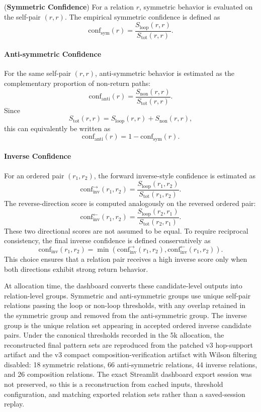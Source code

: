 \documentclass[12pt,a4paper]{article}
\begin{document}
(\textbf{Symmetric Confidence}) 
For a relation $r$, symmetric behavior is evaluated on the self-pair $(r,r)$. The empirical symmetric confidence is defined as
\[
\mathrm{conf}_{\mathrm{sym}}(r)
=
\frac{S_{\mathrm{loop}}(r,r)}
{S_{\mathrm{tot}}(r,r)}.
\]

\paragraph{Anti-symmetric Confidence} 
For the same self-pair $(r,r)$, anti-symmetric behavior is estimated as the complementary proportion of non-return paths:
\[
\mathrm{conf}_{\mathrm{anti}}(r)
=
\frac{S_{\mathrm{non}}(r,r)}
{S_{\mathrm{tot}}(r,r)}.
\]
Since
\[
S_{\mathrm{tot}}(r,r)
=
S_{\mathrm{loop}}(r,r) 
+
S_{\mathrm{non}}(r,r),
\]
this can equivalently be written as
\[
\mathrm{conf}_{\mathrm{anti}}(r)
=
1-\mathrm{conf}_{\mathrm{sym}}(r).
\]


\paragraph{Inverse Confidence} 
For an ordered pair $(r_1,r_2)$, the forward inverse-style confidence is estimated as
\[
\mathrm{conf}_{\mathrm{inv}}^{\rightarrow}(r_1,r_2)
=
\frac{S_{\mathrm{loop}}(r_1,r_2)}
{S_{\mathrm{tot}}(r_1,r_2)}.
\]
The reverse-direction score is computed analogously on the reversed ordered pair:
\[
\mathrm{conf}_{\mathrm{inv}}^{\leftarrow}(r_1,r_2)
=
\frac{S_{\mathrm{loop}}(r_2,r_1)}
{S_{\mathrm{tot}}(r_2,r_1)}.
\]
These two directional scores are not assumed to be equal. To require reciprocal consistency, the final inverse confidence is defined conservatively as
\[
\mathrm{conf}_{\mathrm{inv}}(r_1,r_2)
=
\min\!\left(
\mathrm{conf}_{\mathrm{inv}}^{\rightarrow}(r_1,r_2),
\mathrm{conf}_{\mathrm{inv}}^{\leftarrow}(r_1,r_2)
\right).
\]
This choice ensures that a relation pair receives a high inverse score only when both directions exhibit strong return behavior.

At allocation time, the dashboard converts these candidate-level outputs into relation-level groups. Symmetric and anti-symmetric groups use unique self-pair relations passing the loop or non-loop thresholds, with any overlap retained in the symmetric group and removed from the anti-symmetric group. The inverse group is the unique relation set appearing in accepted ordered inverse candidate pairs. Under the canonical thresholds recorded in the 5k allocation, the reconstructed final pattern sets are reproduced from the patched v3 hop-support artifact and the v3 compact composition-verification artifact with Wilson filtering disabled: 18 symmetric relations, 66 anti-symmetric relations, 44 inverse relations, and 26 composition relations. The exact Streamlit dashboard export session was not preserved, so this is a reconstruction from cached inputs, threshold configuration, and matching exported relation sets rather than a saved-session replay.
\end{document}
